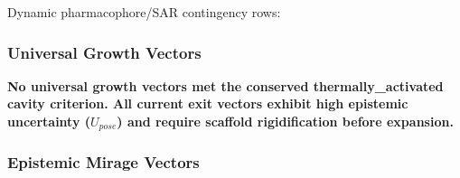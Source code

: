 \documentclass[11pt,a4paper]{article}
\begin{document}
Dynamic pharmacophore/SAR contingency rows:

\hypertarget{universal-growth-vectors}{%
\subsubsection{Universal Growth Vectors}\label{universal-growth-vectors}}

\textbf{No universal growth vectors met the conserved thermally\_activated cavity criterion. All
current exit vectors exhibit high epistemic uncertainty (\(U_{pose}\)) and require scaffold
rigidification before expansion.}

\hypertarget{epistemic-mirage-vectors}{%
\subsubsection{Epistemic Mirage Vectors}\label{epistemic-mirage-vectors}}
\end{document}
